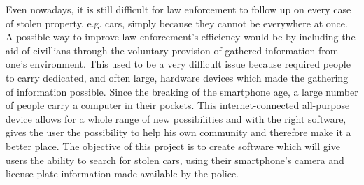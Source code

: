 
Even nowadays, it is still difficult for law enforcement to follow up on every case of stolen property, e.g. cars, simply because they cannot be everywhere at once. A possible way to improve law enforcement's efficiency would be by including the aid of civillians through the voluntary provision of gathered information from one's environment. This used to be a very difficult issue because required people to carry dedicated, and often large, hardware devices which made the gathering of information possible. Since the breaking of the smartphone age, a large number of people carry a computer in their pockets. This internet-connected all-purpose device allows for a whole range of new possibilities and with the right software, gives the user the possibility to help his own community and therefore make it a better place. The objective of this project is to create software which will give users the ability to search for stolen cars, using their smartphone's camera and license plate information made available by the police.








